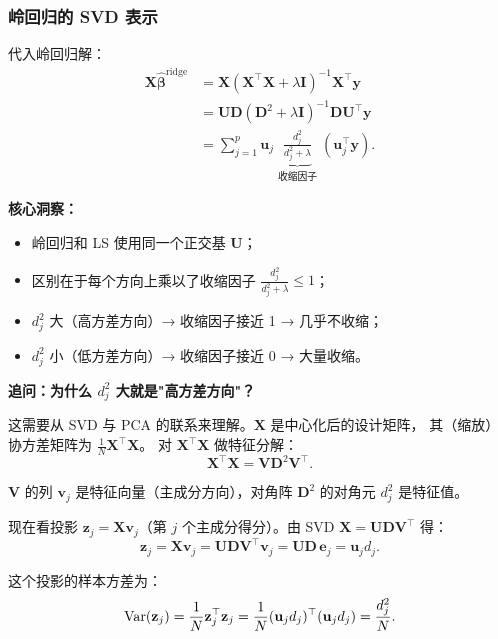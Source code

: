 \subsubsection{岭回归的 SVD 表示}

代入岭回归解：
\begin{align}
    \mathbf{X}\hat{\bm{\beta}}^{\text{ridge}}
    &= \mathbf{X}(\mathbf{X}^\top \mathbf{X} + \lambda \mathbf{I})^{-1} \mathbf{X}^\top \mathbf{y} \nonumber\\
    &= \mathbf{U} \mathbf{D} (\mathbf{D}^2 + \lambda \mathbf{I})^{-1} \mathbf{D} \mathbf{U}^\top \mathbf{y} \nonumber\\
    &= \sum_{j=1}^{p} \mathbf{u}_j \; \underbrace{\frac{d_j^2}{d_j^2 + \lambda}}_{\text{收缩因子}} \; (\mathbf{u}_j^\top \mathbf{y}). \label{eq:ridge_svd}
\end{align}

\textbf{核心洞察：}
\begin{itemize}
    \item 岭回归和 LS 使用同一个正交基 $\mathbf{U}$；
    \item 区别在于每个方向上乘以了收缩因子 $\frac{d_j^2}{d_j^2 + \lambda} \le 1$；
    \item $d_j^2$ 大（高方差方向）→ 收缩因子接近 1 → 几乎不收缩；
    \item $d_j^2$ 小（低方差方向）→ 收缩因子接近 0 → 大量收缩。
\end{itemize}

\medskip
\noindent
\textbf{追问：为什么 $d_j^2$ 大就是"高方差方向"？}

这需要从 SVD 与 PCA 的联系来理解。$\mathbf{X}$ 是中心化后的设计矩阵，
其（缩放）协方差矩阵为 $\frac{1}{N}\mathbf{X}^\top \mathbf{X}$。
对 $\mathbf{X}^\top \mathbf{X}$ 做特征分解：
\[
    \mathbf{X}^\top \mathbf{X} = \mathbf{V} \mathbf{D}^2 \mathbf{V}^\top.
\]

$\mathbf{V}$ 的列 $\mathbf{v}_j$ 是特征向量（主成分方向），对角阵 $\mathbf{D}^2$ 的对角元 $d_j^2$ 是特征值。

现在看投影 $\mathbf{z}_j = \mathbf{X}\mathbf{v}_j$（第 $j$ 个主成分得分）。由 SVD $\mathbf{X} = \mathbf{U}\mathbf{D}\mathbf{V}^\top$ 得：
\[
    \mathbf{z}_j = \mathbf{X}\mathbf{v}_j = \mathbf{U}\mathbf{D}\mathbf{V}^\top \mathbf{v}_j
    = \mathbf{U}\mathbf{D}\,\mathbf{e}_j = \mathbf{u}_j d_j.
\]

这个投影的样本方差为：
\[
    \mathrm{Var}(\mathbf{z}_j) = \frac{1}{N} \mathbf{z}_j^\top \mathbf{z}_j
    = \frac{1}{N} (\mathbf{u}_j d_j)^\top (\mathbf{u}_j d_j)
    = \frac{d_j^2}{N}.
\]

